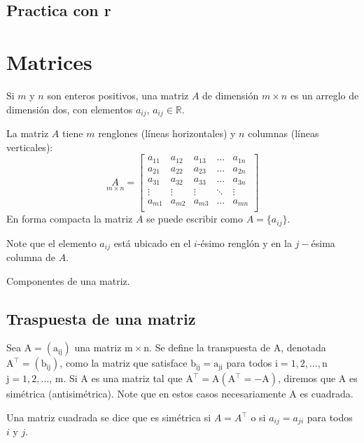 \begin{}
\subsection{Practica con r}



\section{Matrices}

\begin{definition}[Matriz] Si $m$ y $n$ son enteros positivos, una matriz $A$ de dimensión $m\times n$ es un arreglo de dimensión dos, con elementos $a_{ij}$, $a_{ij} \in \mathbb{R}$.
\end{definition}

La matriz $A$ tiene $m$ renglones (líneas horizontales) y $n$ columnas (líneas verticales):\\
$$
\underset{m \times n}A=\begin{bmatrix}
    a_{11} & a_{12} & a_{13} & \dots & a_{1n} \\
    a_{21} & a_{22} & a_{23} & \dots & a_{2n} \\
    a_{31} & a_{32} & a_{33} & \dots & a_{3n} \\
    \vdots & \vdots & \vdots & \ddots & \vdots \\
    a_{m1} & a_{m2} & a_{m3} & \dots & a_{mn} \\
  \end{bmatrix}
$$ En forma compacta la matriz $A$ se puede escribir como
$A=\{a_{ij}\}$.\\

\begin{remark}
Note que el elemento $a_{ij}$ está ubicado en el $i$-ésimo renglón y en la $j-$ésima columna de $A$.
\end{remark}
Componentes de una matriz.\\


\subsection{Traspuesta de una matriz}
\begin{definition}
   Sea $\mathrm{A}=\left(\mathrm{a}_{\mathrm{ij}}\right)$ una matriz $\mathrm{m} \times \mathrm{n}$. Se define la transpuesta de $\mathrm{A}$, denotada $\mathrm{A}^{\top}=\left(\mathrm{b}_{\mathrm{ij}}\right)$, como la matriz que satisface $\mathrm{b}_{\mathrm{ij}}=\mathrm{a}_{\mathrm{ji}}$ para todos $\mathrm{i}=1,2, \ldots, \mathrm{n}$ \,\,\,\,  $\mathrm{j}=1,2, \ldots$, $\mathrm{m}$. Si A es una matriz tal que $\mathrm{A}^{\top}=\mathrm{A}\left(\mathrm{A}^{\top}=-\mathrm{A}\right)$, diremos que $\mathrm{A}$ es simétrica (antisimétrica). Note que en estos casos necesariamente A es cuadrada.
\end{definition}
\begin{definition}
Una matriz cuadrada se dice que es simétrica si \( A = A^{\top} \) o si \( a_{ij} = a_{ji} \) para todos \( i \) y \( j \).
    

\end{definition}
\end{}
